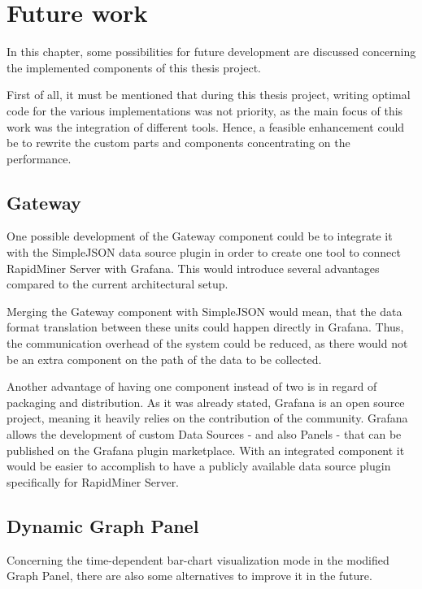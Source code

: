 \chapter{Future work}

In this chapter, some possibilities for future development are discussed concerning the implemented components of this thesis project.

First of all, it must be mentioned that during this thesis project, writing optimal code for the various implementations was not priority, as the main focus of this work was the integration of different tools. Hence, a feasible enhancement could be to rewrite the custom parts and components concentrating on the performance.

\section{Gateway}

One possible development of the Gateway component could be to integrate it with the SimpleJSON data source plugin in order to create one tool to connect RapidMiner Server with Grafana. This would introduce several advantages compared to the current architectural setup.

Merging the Gateway component with SimpleJSON would mean, that the data format translation between these units could happen directly in Grafana. Thus, the communication overhead of the system could be reduced, as there would not be an extra component on the path of the data to be collected.



Another advantage of having one component instead of two is in regard of packaging and distribution. As it was already stated, Grafana is an open source project, meaning it heavily relies on the contribution of the community. Grafana allows the development of custom Data Sources - and also Panels - that can be published on the Grafana plugin marketplace. With an integrated component it would be easier to accomplish to have a publicly available data source plugin specifically for RapidMiner Server. 

\section{Dynamic Graph Panel}

Concerning the time-dependent bar-chart visualization mode in the modified Graph Panel, there are also some alternatives to improve it in the future.

